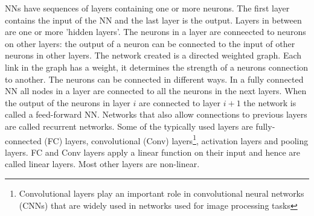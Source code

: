 \documentclass[../theses.tex]{subfiles}
\begin{document}


NNs have sequences of layers containing one or more neurons. The first layer contains the input of the NN and the last layer is the output. Layers in between are one or more 'hidden layers'. The neurons in a layer are conneected to neurons on other layers: the output of a neuron can be connected to the input of other neurons in other layers. The network created is a directed weighted graph. Each link in the graph has a weight, it determines the strength of a neurons connection to another. The neurons can be connected in different ways. In a fully connected NN all nodes in a layer are connected to all the neurons in the next layers. When the output of the neurons in layer $i$ are connected to layer $i+1$ the network is called a feed-forward NN. Networks that also allow connections to previous layers are called recurrent networks. Some of the typically used layers are fully-connected (FC) layers, convolutional (Conv) layers\footnote{Convolutional layers play an important role in convolutional neural networks (CNNs) that are widely used in networks used for image processing tasks}, activation layers and pooling layers. FC and Conv layers apply a linear function on their input and hence are called linear layers. Most other layers are non-linear. 
\end{document}
